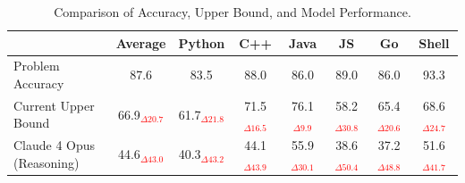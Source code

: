 \begin{table}[t]
\small
\begin{tabular}{lccccccc}
\toprule
                    & \textbf{Average}  & \textbf{Python} & \textbf{C++} & \textbf{Java} & \textbf{JS} & \textbf{Go} & \textbf{Shell} \\
                    \midrule
Problem Accuracy    & 87.6 & 83.5            & 88.0           & 86.0            & 89.0          & 86.0          & 93.3           \\
\midrule
Current Upper Bound & 66.9\textcolor{red}{$_{\Delta20.7}$} & 61.7\textcolor{red}{$_{\Delta21.8}$}            & 71.5\textcolor{red}{$_{\Delta16.5}$}         & 76.1\textcolor{red}{$_{\Delta9.9}$}          & 58.2\textcolor{red}{$_{\Delta30.8}$}        & 65.4\textcolor{red}{$_{\Delta20.6}$}        & 68.6\textcolor{red}{$_{\Delta24.7}$}           \\
\midrule
Claude 4 Opus (Reasoning)    & 44.6\textcolor{red}{$_{\Delta43.0}$} & 40.3\textcolor{red}{$_{\Delta43.2}$}            & 44.1\textcolor{red}{$_{\Delta43.9}$}         & 55.9\textcolor{red}{$_{\Delta30.1}$}          & 38.6\textcolor{red}{$_{\Delta50.4}$}        & 37.2\textcolor{red}{$_{\Delta48.8}$}        & 51.6\textcolor{red}{$_{\Delta41.7}$}   \\
\bottomrule
\end{tabular}
\caption{Comparison of Accuracy, Upper Bound, and Model Performance.}
\label{appendix:accuracy}
\end{table}





